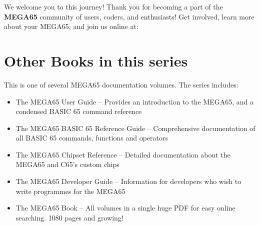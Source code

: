 We welcome you to this journey! Thank you for becoming a part of the {\bf MEGA65}
community of users, coders, and enthusiasts! Get involved, learn more
about your MEGA65, and join us online at:


\section{Other Books in this series}

This is one of several MEGA65 documentation volumes.  The series includes:

\begin{itemize}
	\item The MEGA65 User Guide -- Provides an introduction to the MEGA65, and a condensed BASIC 65 command reference
	\item The MEGA65 BASIC 65 Reference Guide -- Comprehensive documentation of all BASIC 65 commands, functions and operators
	\item The MEGA65 Chipset Reference -- Detailed documentation about the MEGA65 and C65's custom chips
	\item The MEGA65 Developer Guide -- Information for developers who wish to write programmes for the MEGA65
	\item The MEGA65 Book -- All volumes in a single huge PDF for easy online searching. 1080 pages and growing!
\end{itemize}
